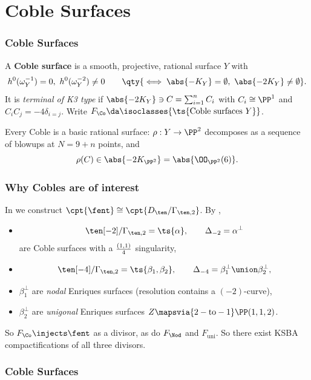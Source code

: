 \documentclass{beamer}
\begin{document}
{\section{Coble Surfaces}

\begin{frame}\frametitle{Coble Surfaces}
\begin{definition}
A \textbf{Coble surface} \cite{Cob19, Oda85, DZ99, DM20} is a smooth, projective, rational surface $Y$ with 
\[
h^0(\omega_Y^{-1}) = 0, \,\, h^0(\omega_Y^{-2})\neq 0\qquad \qty{\iff \abs{-K_Y} = \emptyset,\,\, \abs{-2K_Y}\neq \emptyset }
.\] 
It is \textit{terminal of K3 type} if $\abs{-2K_Y} \ni C = \sum_{i=1}^n C_i$ with $C_i\cong \PP^1$ and $C_iC_j = -4\delta_{i=j}$. Write $F_{\Co} \da \isoclasses{\ts{\text{Coble surfaces } Y}}$.
\end{definition}
\begin{fact}
Every Coble is a basic rational surface: $\rho: Y\to \PP^2$ decomposes as a sequence of blowups at $N = 9+n$ points, and 
\[
\rho(C) \in \abs{-2K_{\PP^2}} = \abs{ \OO_{\PP^2}(6)}
.\]
\end{fact}
\end{frame}
\begin{frame}\frametitle{Why Cobles are of interest}
In \cite{AEGS23} we construct $\cpt{ \fent} \cong \cpt{D_{\ten}/\Gamma_{\ten, 2}}$. By \cite{Nam85},
\begin{itemize}
\item \[ \ten[-2]/\Gamma_{\ten, 2} = \ts{\alpha}, \qquad \Delta_{-2} = \alpha^\perp \] are Coble surfaces with a ${(1,1)\over 4}$ singularity,
\item \[ \ten[-4]/\Gamma_{\ten, 2} = \ts{\beta_1, \beta_2}, \qquad \Delta_{-4} = \beta_1^\perp \union \beta_2^\perp, \]
\item $\beta_1^\perp$ are \textit{nodal} Enriques surfaces (resolution contains a $(-2)$-curve),
\item $\beta_2^{\perp}$ are \textit{unigonal} Enriques surfaces $Z \mapsvia{2-\text{to}-1} \PP(1,1,2)$.
\end{itemize}
{\small 
So $F_{\Co} \injects \fent$ as a divisor, as do $F_{\Nod}$ and $F_{\mathrm{uni}}$. So there exist KSBA compactifications of all three divisors.
}
\end{frame}
\begin{frame}\frametitle{Coble Surfaces}

\end{frame}}
\end{document}
